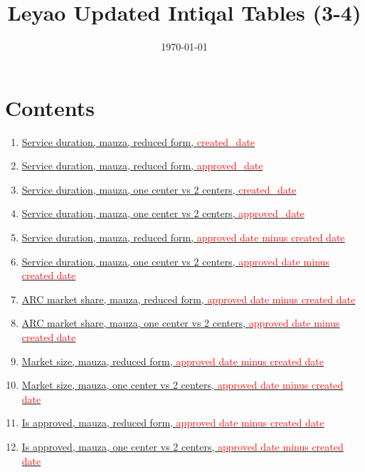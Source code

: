 \documentclass[12pt]{article}
\title{Leyao Updated Intiqal Tables (3-4)}
\date{\today}
\begin{document}
\maketitle
\thispagestyle{empty}

\section*{Contents}
\begin{enumerate}
  \item \hyperref[tab:intiqal_1_service_duration_mauza_reduced_3_4]{Service duration, mauza, reduced form, \textcolor{red}{created\_date}}
  \item \hyperref[tab:intiqal_2_service_duration_mauza_reduced_3_4]{Service duration, mauza, reduced form, \textcolor{red}{approved\_date}}
  \item \hyperref[tab:intiqal_1_service_duration_mauza_3_4]{Service duration, mauza, one center vs 2 centers, \textcolor{red}{created\_date}}
  \item \hyperref[tab:intiqal_2_service_duration_mauza_3_4]{Service duration, mauza, one center vs 2 centers, \textcolor{red}{approved\_date}}
  \item \hyperref[tab:intiqal_3_service_duration_mauza_reduced_3_4]{Service duration, mauza, reduced form, \textcolor{red}{approved date minus created date}}
  \item \hyperref[tab:intiqal_3_service_duration_mauza_3_4]{Service duration, mauza, one center vs 2 centers, \textcolor{red}{approved date minus created date}}
  \item \hyperref[tab:intiqal_arc_marketshare_mauza_reduced_3_4]{ARC market share, mauza, reduced form, \textcolor{red}{approved date minus created date}}
  \item \hyperref[tab:intiqal_arc_marketshare_mauza_3_4]{ARC market share, mauza, one center vs 2 centers, \textcolor{red}{approved date minus created date}}
  \item \hyperref[tab:intiqal_marketsize_mauza_reduced_3_4]{Market size, mauza, reduced form, \textcolor{red}{approved date minus created date}}
  \item \hyperref[tab:intiqal_marketsize_mauza_3_4]{Market size, mauza, one center vs 2 centers, \textcolor{red}{approved date minus created date}}
  \item \hyperref[tab:intiqal_isapproved_mauza_reduced_3_7]{Is approved, mauza, reduced form, \textcolor{red}{approved date minus created date}}
  \item \hyperref[tab:intiqal_isapproved_mauza_3_7]{Is approved, mauza, one center vs 2 centers, \textcolor{red}{approved date minus created date}}
\end{enumerate}
\end{document}
